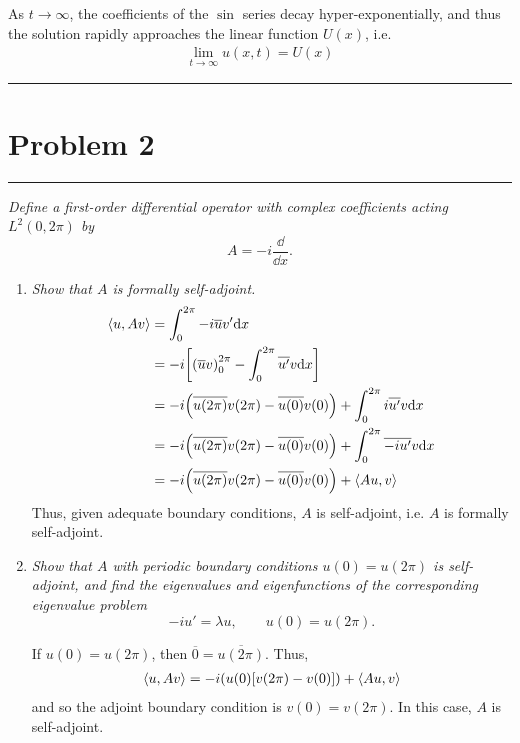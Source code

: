 \documentclass{article} %
\theoremstyle{plain}
\newcommand{\problem}[1]{
\vspace{.375cm}
\begin{minipage}{\textwidth}
    \begin{center}
        \noindent\rule{5cm}{1pt}
    \end{center}
    \section{\bf #1}
    \begin{center}
        \noindent\rule{5cm}{1pt}
    \end{center}
    \vspace{0.25cm}
\end{minipage}
}
\newcommand{\VEC}[2]{\left\langle #1, #2 \right\rangle}
\begin{document}
\begin{enumerate}[\bf (a)]
        As $t \rightarrow \infty$, the coefficients of the $\sin$ series decay hyper-exponentially, and thus the solution rapidly approaches the linear function $U(x)$, i.e.
        \begin{align*}
            \lim_{t\rightarrow \infty} u(x,t) = U(x)
        \end{align*}
\end{enumerate}

\problem{Problem 2}
\emph{Define a first-order differential operator with complex coefficients acting $L^2(0, 2\pi)$ by $$A = -i \frac{\dd}{\dd x}.$$}
\begin{enumerate}[\bf (a)]
    \item
        \emph{Show that $A$ is formally self-adjoint.}
        \begin{align*}
            \VEC{u}{Av} &= \int_0^{2\pi} -i\overline{u}v'\dd x \\
            &= -i\qty[\qty(\overline{u}v)_0^{2\pi} - \int_0^{2\pi}\overline{u'}v\dd x] \\
            &= -i\qty(\overline{u(2\pi)}v(2\pi) - \overline{u(0)}v(0)) + \int_0^{2\pi} i \overline{u'}v \dd x \\
            &= -i\qty(\overline{u(2\pi)}v(2\pi) - \overline{u(0)}v(0)) + \int_0^{2\pi} \overline{-iu'}v \dd x \\
            &= -i\qty(\overline{u(2\pi)}v(2\pi) - \overline{u(0)}v(0)) + \VEC{Au}{v}
        \end{align*}
        Thus, given adequate boundary conditions, $A$ is self-adjoint, i.e. $A$ is formally self-adjoint.
    \item
        \emph{Show that $A$ with periodic boundary conditions $u(0) = u(2\pi)$ is self-adjoint, and find the eigenvalues and eigenfunctions of the corresponding eigenvalue problem $$ -iu' = \lambda u, \qquad u(0) = u(2\pi).$$}

        If $u(0) = u(2\pi)$, then $\overline{0} = \overline{u(2\pi)}$.  Thus,
        \begin{align*}
            \VEC{u}{Av} = -i\qty(u(0)\qty[v(2\pi) - v(0)]) + \VEC{Au}{v}
        \end{align*}
        and so the adjoint boundary condition is $v(0) = v(2\pi)$.  In this case, $A$ is self-adjoint.


\end{enumerate}
\end{document}
